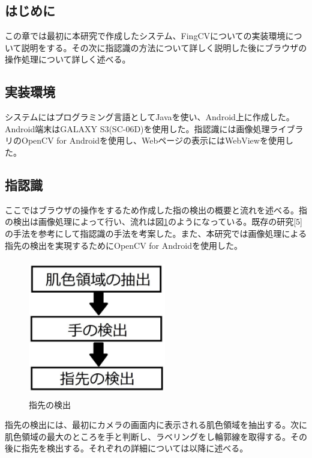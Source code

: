 \documentclass[11pt,a4j, titlepage]{jarticle} %
\begin{document}
\subsection{はじめに}
この章では最初に本研究で作成したシステム、FingCVについての実装環境について説明をする。その次に指認識の方法について詳しく説明した後にブラウザの操作処理について詳しく述べる。

\subsection{実装環境}
システムにはプログラミング言語としてJavaを使い、Android上に作成した。Android端末はGALAXY S3(SC-06D)を使用した。指認識には画像処理ライブラリのOpenCV for Androidを使用し、Webページの表示にはWebViewを使用した。

\subsection{指認識}
ここではブラウザの操作をするため作成した指の検出の概要と流れを述べる。指の検出は画像処理によって行い、流れは図\ref{fig:f13}のようになっている。既存の研究[5]の手法を参考にして指認識の手法を考案した。また、本研究では画像処理による指先の検出を実現するためにOpenCV for Androidを使用した。

\begin{figure}[H]
	\centering
	\includegraphics[width=6cm,height=6cm]{yubisakinagare.eps}
	\caption{指先の検出}
	\label{fig:f13}
\end{figure}

指先の検出には、最初にカメラの画面内に表示される肌色領域を抽出する。次に肌色領域の最大のところを手と判断し、ラベリングをし輪郭線を取得する。その後に指先を検出する。それぞれの詳細については以降に述べる。
\end{document}
